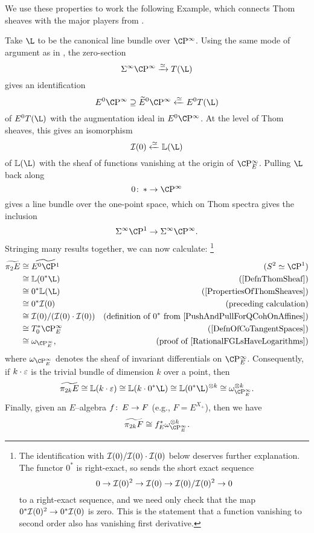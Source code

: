 We use these properties to work the following Example, which connects Thom sheaves with the major players from .

\begin{example}\label{Pi2AndInvariantDiffls}
Take $\L$ to be the canonical line bundle over $\CP^\infty$.  Using the same mode of argument as in , the zero-section \[\Susp^\infty \CP^\infty \xrightarrow{\simeq} T(\L)\] gives an identification \[E^0 \CP^\infty \supseteq \widetilde E^0 \CP^\infty \xleftarrow{\simeq} E^0 T(\L)\] of $E^0 T(\L)$ with the augmentation ideal in $E^0 \CP^\infty$.  At the level of Thom sheaves, this gives an isomorphism \[\sheaf I(0) \xleftarrow{\simeq} \ThomSheaf{\L}\] of $\ThomSheaf{\L}$ with the sheaf of functions vanishing at the origin of $\CP^\infty_E$.  Pulling $\L$ back along \[0\co * \to \CP^\infty\] gives a line bundle over the one-point space, which on Thom spectra gives the inclusion \[\Susp^\infty \CP^1 \to \Susp^\infty \CP^\infty.\]  Stringing many results together, we can now calculate:
\footnote{The identification with $\mathcal{I}(0) / \mathcal{I}(0) \cdot \mathcal{I}(0)$ below deserves further explanation.  The functor $0^*$ is right-exact, so sends the short exact sequence \[0 \to \mathcal{I}(0)^2 \to \mathcal{I}(0) \to \mathcal{I}(0) / \mathcal{I}(0)^2 \to 0\] to a right-exact sequence, and we need only check that the map $0^* \mathcal{I}(0)^2 \to 0^* \mathcal{I}(0)$ is zero.  This is the statement that a function vanishing to second order also has vanishing first derivative.}
\begin{align*}
\widetilde{\pi_2 E} & \cong \widetilde{E^0 \CP^1} & \text{($S^2 \simeq \CP^1$)} \\
& \cong \ThomSheaf{0^* \L} & \text{(\Cref{DefnThomSheaf})} \\
& \cong 0^* \ThomSheaf{\L} & \text{(\Cref{PropertiesOfThomSheaves})} \\
& \cong 0^* \sheaf I(0) & \text{(preceding calculation)} \\
& \cong \sheaf I(0) / (\sheaf I(0) \cdot \sheaf I(0)) & \text{(definition of $0^*$ from \Cref{PushAndPullForQCohOnAffines})} \\
& \cong T^*_0 \CP^\infty_E & \text{(\Cref{DefnOfCoTangentSpaces})} \\
& \cong \omega_{\CP^\infty_E}, & \text{(proof of \Cref{RationalFGLsHaveLogarithms})}
\end{align*}
where $\omega_{\CP^\infty_E}$ denotes the sheaf of invariant differentials on $\CP^\infty_E$.  Consequently, if $k \cdot \varepsilon$ is the trivial bundle of dimension $k$ over a point, then \[\widetilde{\pi_{2k} E} \cong \ThomSheaf{k \cdot \eps} \cong \ThomSheaf{k \cdot 0^* \L} \cong \ThomSheaf{0^* \L}^{\otimes k} \cong \omega_{\CP^\infty_E}^{\otimes k}.\]  Finally, given an $E$--algebra $f \colon\thinspace E \to F$ (e.g., $F = E^{X_+}$), then we have \[\widetilde{\pi_{2k} F} \cong f_E^* \omega_{\CP^\infty_E}^{\otimes k}.\]
\end{example}

